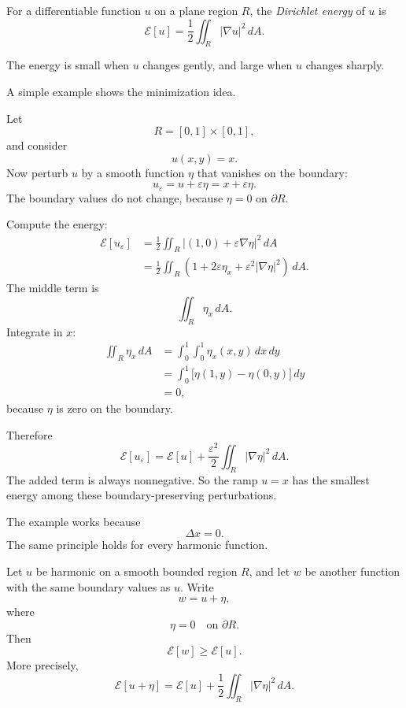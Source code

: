 \begin{definition}
For a differentiable function \(u\) on a plane region \(R\), the \emph{Dirichlet energy}
of \(u\) is
\[
\boxed{
    \mathcal E[u]
    =
    \frac12\iint_R |\nabla u|^2\,dA.
}
\]
\end{definition}

The energy is small when \(u\) changes gently, and large when \(u\) changes sharply.

A simple example shows the minimization idea.

\begin{example}
Let
\[
    R=[0,1]\times[0,1],
\]
and consider
\[
    u(x,y)=x.
\]
Now perturb \(u\) by a smooth function \(\eta\) that vanishes on the boundary:
\[
    u_\varepsilon=u+\varepsilon\eta=x+\varepsilon\eta.
\]
The boundary values do not change, because \(\eta=0\) on \(\partial R\).

Compute the energy:
\[
\begin{aligned}
\mathcal E[u_\varepsilon]
&=
\frac12\iint_R
\left|(1,0)+\varepsilon\nabla\eta\right|^2\,dA\\
&=
\frac12\iint_R
\left(1+2\varepsilon\eta_x+\varepsilon^2|\nabla\eta|^2\right)\,dA.
\end{aligned}
\]
The middle term is
\[
    \iint_R \eta_x\,dA.
\]
Integrate in \(x\):
\[
\begin{aligned}
\iint_R \eta_x\,dA
&=
\int_0^1\int_0^1 \eta_x(x,y)\,dx\,dy\\
&=
\int_0^1\bigl[\eta(1,y)-\eta(0,y)\bigr]\,dy\\
&=
0,
\end{aligned}
\]
because \(\eta\) is zero on the boundary.

Therefore
\[
\boxed{
    \mathcal E[u_\varepsilon]
    =
    \mathcal E[u]
    +
    \frac{\varepsilon^2}{2}\iint_R|\nabla\eta|^2\,dA.
}
\]
The added term is always nonnegative.  So the ramp \(u=x\) has the smallest energy
among these boundary-preserving perturbations.
\end{example}

The example works because
\[
    \Delta x=0.
\]
The same principle holds for every harmonic function.

\begin{theorem}
Let \(u\) be harmonic on a smooth bounded region \(R\), and let \(w\) be another
function with the same boundary values as \(u\).  Write
\[
    w=u+\eta,
\]
where
\[
    \eta=0
    \quad\text{on }\partial R.
\]
Then
\[
\boxed{
    \mathcal E[w]\ge \mathcal E[u].
}
\]
More precisely,
\[
\boxed{
    \mathcal E[u+\eta]
    =
    \mathcal E[u]
    +
    \frac12\iint_R|\nabla\eta|^2\,dA.
}
\]
\end{theorem}

